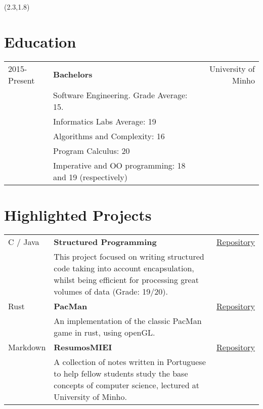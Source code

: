 \documentclass{article}
\begin{document}
\begin{textblock}{7.3}(2.3,1.8)

    \section{Education}
    \begin{tabular}{lp{8.4cm}r}
        2015-Present & \textbf{Bachelors} & University of Minho\\
        & Software Engineering. Grade Average: 15. &\\
        & Informatics Labs Average: 19 & \\
        & Algorithms and Complexity: 16 & \\
        & Program Calculus: 20 & \\
        & Imperative and OO programming: 18 and 19 (respectively) &\\
    \end{tabular}
    \section{Highlighted Projects}
    \begin{tabular}{lp{10.4cm}r}
        C / Java & \textbf{Structured Programming} & \href{https://github.com/Mendess2526/LI3_StructuredPrograming}{Repository}\\
        & This project focused on writing structured code taking into account
        encapsulation, whilst being efficient for processing great volumes of
        data (Grade: 19/20). &\\
        Rust & \textbf{PacMan} & \href{https://github.com/Mendess2526/rust-pacman}{Repository}\\
        & An implementation of the classic PacMan game in rust, using openGL. &\\
        Markdown & \textbf{ResumosMIEI} & \href{https://github.com/Mendess2526/ResumosMIEI}{Repository}\\
        & A collection of notes written in Portuguese to help fellow students
        study the base concepts of computer science, lectured at University of
        Minho. &\\
    \end{tabular}


\end{textblock}
\end{document}
